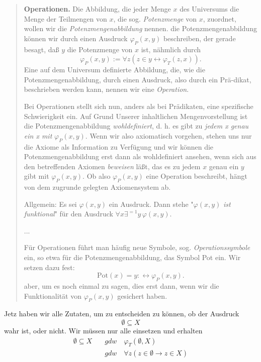 \documentclass[11pt, a4paper]{article}
\begin{document}
\begin{quote}
    \textbf{Operationen.} Die Abbildung, die jeder Menge $x$ des Universums
    die Menge der Teilmengen von $x$, die sog. \textit{Potenzmenge} von $x$,
    zuordnet, wollen wir die \textit{Potenzmengenabbildung} nennen. die
    Potenzmengenabbildung können wir durch einen Ausdruck $\varphi_P(x,y)$
    beschreiben, der gerade besagt, daß $y$ die Potenzmenge von $x$ ist,
    nähmlich durch
    \[
        \varphi_P(x,y) := \forall z(z\in y\leftrightarrow\varphi_T(z, x)).
    \]
    Eine auf dem Universum definierte Abbildung, die, wie die
    Potenzmengenabbildung, durch einen Ausdruck, also durch ein Prä-dikat,
    beschrieben werden kann, nennen wir eine \textit{Operation}.

    Bei Operationen stellt sich nun, anders als bei Prädikaten, eine
    spezifische Schwierigkeit ein. Auf Grund Unserer inhaltlichen
    Mengenvorstellung ist die Potenzmengenabbildung \textit{wohldefiniert}, d.
    h. es gibt zu \textit{jedem x genau ein x mit} $\varphi_P(x,y)$. Wenn wir
    also axiomatisch vorgehen, stehen uns nur die Axiome als Information zu
    Verfügung und wir können die Potenzmengenabbildung erst dann als
    wohldefiniert ansehen, wenn sich aus den betreffenden Axiomen
    \textit{beweisen} läßt, das es zu jedem $x$ genau ein $y$ gibt mit
    $\varphi_P(x,y)$. Ob also $\varphi_P(x,y)$ eine Operation beschreibt,
    hängt von dem zugrunde gelegten Axiomensystem ab.

    Allgemein: Es sei $\varphi(x,y)$ ein Ausdruck. Dann stehe "$\varphi(x,y)$
    \textit{ist funktional}" für den Ausdruck $\forall x\exists^{=1}y\,
    \varphi(x,y)$.
    
    ...

    Für Operationen führt man häufig neue Symbole, sog.
    \textit{Operationssymbole} ein, so etwa für die Potenzmengenabbildung, das
    Symbol Pot ein. Wir setzen dazu fest:
    \[
        \textrm{Pot}(x) = y :\leftrightarrow\varphi_P(x,y).
    \]
    aber, um es noch einmal zu sagen, dies erst dann, wenn wir die
    Funktionalität von $\varphi_P(x,y)$ gesichert haben.
\end{quote}


Jetz haben wir alle Zutaten, um zu entscheiden zu können, ob der
Ausdruck
\[
    \emptyset \subseteq X
\]
wahr ist, oder nicht. Wir müssen nur alle einsetzen und erhalten
\begin{equation}
\begin{split}
    \emptyset \subseteq X & \quad gdw\quad \varphi_T(\emptyset, X) \\ 
     & \quad gdw\quad\forall z(z\in \emptyset \rightarrow z\in X)
\end{split}
\end{equation}

\newpage   
\end{document}

